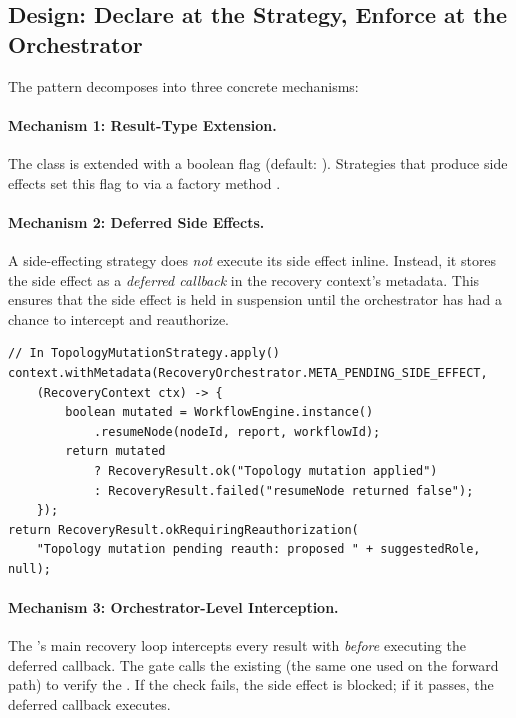 \subsection{Design: Declare at the Strategy, Enforce at the Orchestrator}
\label{sec:design-decomposition}

The pattern decomposes into three concrete mechanisms:

\paragraph{Mechanism 1: Result-Type Extension.}
The  class is extended with a boolean  flag (default: ). Strategies that produce side effects set this flag to  via a factory method .

\paragraph{Mechanism 2: Deferred Side Effects.}
A side-effecting strategy does \emph{not} execute its side effect inline. Instead, it stores the side effect as a \emph{deferred callback} in the recovery context's metadata. This ensures that the side effect is held in suspension until the orchestrator has had a chance to intercept and reauthorize.

\begin{lstlisting}[caption={Deferring the side effect in \code{TopologyMutationStrategy}.},label={lst:defer-side-effect}]
// In TopologyMutationStrategy.apply()
context.withMetadata(RecoveryOrchestrator.META_PENDING_SIDE_EFFECT,
    (RecoveryContext ctx) -> {
        boolean mutated = WorkflowEngine.instance()
            .resumeNode(nodeId, report, workflowId);
        return mutated
            ? RecoveryResult.ok("Topology mutation applied")
            : RecoveryResult.failed("resumeNode returned false");
    });
return RecoveryResult.okRequiringReauthorization(
    "Topology mutation pending reauth: proposed " + suggestedRole, null);
\end{lstlisting}

\paragraph{Mechanism 3: Orchestrator-Level Interception.}
The 's main recovery loop intercepts every result with  \emph{before} executing the deferred callback. The gate calls the existing  (the same one used on the forward path) to verify the \privinv{}. If the check fails, the side effect is blocked; if it passes, the deferred callback executes.

